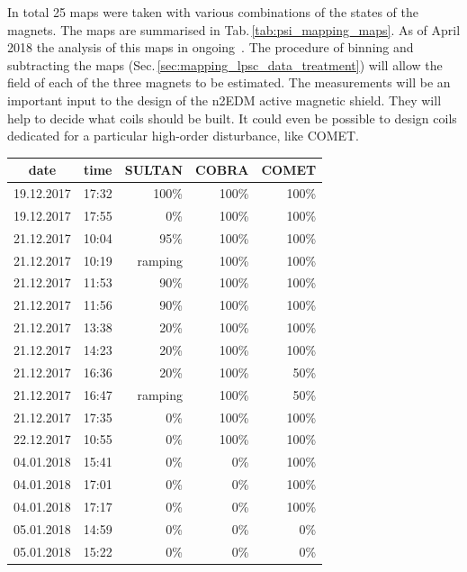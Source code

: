 In total 25 maps were taken with various combinations of the states of the magnets.
The maps are summarised in Tab.\,\ref{tab:psi_mapping_maps}.
As of April 2018 the analysis of this maps in ongoing~\cite{EmmeneggerThesis}.
The procedure of binning and subtracting the maps (Sec.\,\ref{sec:mapping_lpsc_data_treatment}) will allow the field of each of the three magnets to be estimated.
The measurements will be an important input to the design of the n2EDM active magnetic shield.
They will help to decide what coils should be built.
It could even be possible to design coils dedicated for a particular high-order disturbance, like COMET\@.

\begin{table}
  \centering
  \begin{tabular}{ccrrr}
    date        &  time   &  SULTAN   &  COBRA  &  COMET \\ \midrule
    19.12.2017  &  17:32  &  100\%    &  100\%  &  100\%  \\
    19.12.2017  &  17:55  &  0\%      &  100\%  &  100\%  \\
    21.12.2017  &  10:04  &  95\%     &  100\%  &  100\%  \\
    21.12.2017  &  10:19  &  ramping  &  100\%  &  100\%  \\
    21.12.2017  &  11:53  &  90\%     &  100\%  &  100\%  \\
    21.12.2017  &  11:56  &  90\%     &  100\%  &  100\%  \\
    21.12.2017  &  13:38  &  20\%     &  100\%  &  100\%  \\
    21.12.2017  &  14:23  &  20\%     &  100\%  &  100\%  \\
    21.12.2017  &  16:36  &  20\%     &  100\%  &  50\%   \\
    21.12.2017  &  16:47  &  ramping  &  100\%  &  50\%   \\
    21.12.2017  &  17:35  &  0\%      &  100\%  &  100\%  \\
    22.12.2017  &  10:55  &  0\%      &  100\%  &  100\%  \\
    04.01.2018  &  15:41  &  0\%      &  0\%    &  100\%  \\
    04.01.2018  &  17:01  &  0\%      &  0\%    &  100\%  \\
    04.01.2018  &  17:17  &  0\%      &  0\%    &  100\%  \\
    05.01.2018  &  14:59  &  0\%      &  0\%    &  0\%    \\
    05.01.2018  &  15:22  &  0\%      &  0\%    &  0\%    \\

\end{tabular}
\end{table}
